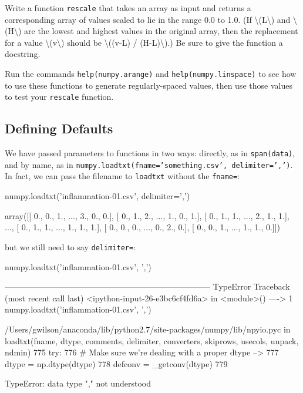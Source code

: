 \documentclass{book}
\begin{document}
\begin{challenge}
  Write a function \texttt{rescale} that takes an array as input and
  returns a corresponding array of values scaled to lie in the range 0.0
  to 1.0. (If \textbackslash{}(L\textbackslash{}) and
  \textbackslash{}(H\textbackslash{}) are the lowest and highest values
  in the original array, then the replacement for a value
  \textbackslash{}(v\textbackslash{}) should be \textbackslash{}((v-L) /
  (H-L)\textbackslash{}).) Be sure to give the function a docstring.
\end{challenge}

\begin{challenge}
  Run the commands \texttt{help(numpy.arange)} and
  \texttt{help(numpy.linspace)} to see how to use these functions to
  generate regularly-spaced values, then use those values to test your
  \texttt{rescale} function.
\end{challenge}

\subsection{Defining Defaults}

We have passed parameters to functions in two ways: directly, as in
\texttt{span(data)}, and by name, as in
\texttt{numpy.loadtxt(fname='something.csv', delimiter=',')}. In fact,
we can pass the filename to \texttt{loadtxt} without the
\texttt{fname=}:

\begin{VerbIn}
numpy.loadtxt('inflammation-01.csv', delimiter=',')
\end{VerbIn}

\begin{VerbOut}
array([[ 0.,  0.,  1., ...,  3.,  0.,  0.],
       [ 0.,  1.,  2., ...,  1.,  0.,  1.],
       [ 0.,  1.,  1., ...,  2.,  1.,  1.],
       ...,
       [ 0.,  1.,  1., ...,  1.,  1.,  1.],
       [ 0.,  0.,  0., ...,  0.,  2.,  0.],
       [ 0.,  0.,  1., ...,  1.,  1.,  0.]])
\end{VerbOut}

but we still need to say \texttt{delimiter=}:

\begin{VerbIn}
numpy.loadtxt('inflammation-01.csv', ',')
\end{VerbIn}

\begin{VerbErr}
---------------------------------------------------------------------------
TypeError                                 Traceback (most recent call last)
<ipython-input-26-e3bc6cf4fd6a> in <module>()
----> 1 numpy.loadtxt('inflammation-01.csv', ',')

/Users/gwilson/anaconda/lib/python2.7/site-packages/numpy/lib/npyio.pyc in loadtxt(fname, dtype, comments, delimiter, converters, skiprows, usecols, unpack, ndmin)
    775     try:
    776         # Make sure we're dealing with a proper dtype
--> 777         dtype = np.dtype(dtype)
    778         defconv = _getconv(dtype)
    779

TypeError: data type "," not understood
\end{VerbErr}
\end{document}
